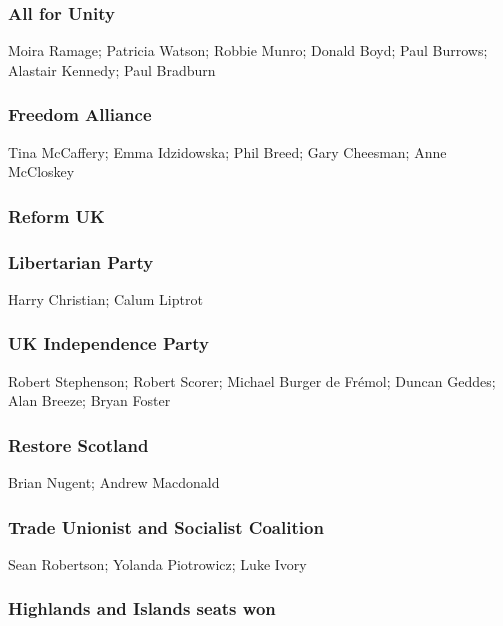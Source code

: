 \begin{resultsiii}
	\subsubsection*{All for Unity}
	Moira Ramage; Patricia Watson; Robbie Munro; Donald Boyd; Paul Burrows; Alastair Kennedy; Paul Bradburn
	
	\subsubsection*{Freedom Alliance}
	Tina McCaffery; Emma Idzidowska; Phil Breed; Gary Cheesman; Anne McCloskey
	
	\subsubsection*{Reform UK}
	
	\subsubsection*{Libertarian Party}
	Harry Christian; Calum Liptrot
	
	\subsubsection*{UK Independence Party}
	Robert Stephenson; Robert Scorer; Michael Burger de Frémol; Duncan Geddes; Alan Breeze; Bryan Foster
	
	\subsubsection*{Restore Scotland}
	Brian Nugent; Andrew Macdonald
	
	\subsubsection*{Trade Unionist and Socialist Coalition}
	Sean Robertson; Yolanda Piotrowicz; Luke Ivory
\end{resultsiii}

\vfill\eject

\subsubsection*{Highlands and Islands seats won}


